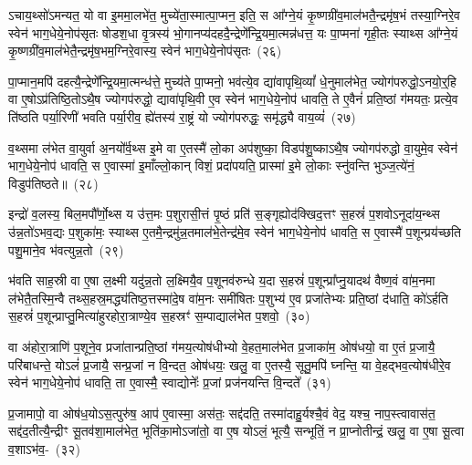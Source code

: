 ऽचाय॒थ्सो॑\-ऽमन्यत॒ यो वा इ॒ममा॒लभे॑त॒ मुच्ये॑ता॒स्मात्पा॒\-प्मन॒ इति॒ स आ᳚ग्ने॒यं कृ॒ष्णग्री॑व॒माल॑भतै॒न्द्रमृ॑ष॒भं तस्या॒ग्निरे॒व स्वेन॑ भाग॒धेये॒नोप॑सृतः षोडश॒धा वृ॒त्रस्य॑ भो॒गानप्य॑दह\-दै॒न्द्रेणे᳚न्द्रि॒य\-मा॒त्मन्न॑धत्त॒ यः पा॒प्मना॑ गृही॒तः स्याथ्स आ᳚ग्ने॒यं कृ॒ष्णग्री॑व॒माल॑भेतै॒न्द्रमृ॑ष॒भम॒ग्निरे॒वास्य॒ स्वेन॑ भाग॒धेये॒नोप॑सृतः~(२६)

पा॒प्मान॒मपि॑ दहत्यै॒न्द्रेणे᳚न्द्रि॒यमा॒त्मन्ध॑त्ते॒ मुच्य॑ते पा॒प्मनो॒ भव॑त्ये॒व द्या॑वापृथि॒व्यां᳚ धे॒नुमा\-ल॑भेत॒ ज्योग॑परुद्धो॒\-ऽनयो॒र्॒\mbox{}हि वा ए॒षो\-ऽप्र॑तिष्ठि॒तो\-ऽथै॒ष ज्योगप॑रुद्धो॒ द्यावा॑पृथि॒वी ए॒व स्वेन॑ भाग॒धेये॒नोप॑ धावति॒ ते ए॒वैनं॑ प्रति॒ष्ठां ग॑मयतः॒ प्रत्ये॒व ति॑ष्ठति पर्या॒रिणी॑ भवति पर्या॒रीव॒ ह्ये॑तस्य॑ रा॒ष्ट्रं यो ज्योग॑परुद्धः॒ समृ॑द्ध्यै वाय॒व्यं॑~(२७)

व॒थ्समा ल॑भेत वा॒युर्वा अ॒नयो᳚र्व॒थ्स इ॒मे वा ए॒तस्मै॑ लो॒का अप॑शुष्का॒ विडप॑शु॒ष्का\-ऽथै॒ष ज्योगप॑रुद्धो वा॒युमे॒व स्वेन॑ भाग॒धेये॒नोप॑ धावति॒ स ए॒वास्मा॑ इ॒माँल्लो॒कान् विशं॒ प्रदा॑पयति॒ प्रास्मा॑ इ॒मे लो॒काः स्नु॑वन्ति भुञ्ज॒त्ये॑नं॒ विडुप॑तिष्ठते॥~(२८)

{\anuvakamend[{म॒ध्यन्दि॑ने॒ कद्रुं॑ य॒मस्य॒ स्पर्ध॑मानो वैष्णावरु॒णीन्तमिन्द्रो᳚\-ऽस्य॒ स्वेन॑ भाग॒धेये॒नोप॑सृतो वाय॒व्यं॑ द्विच॑त्वारिꣳशच्च।}]}

इन्द्रो॑ व॒लस्य॒ बिल॒मपौ᳚र्णो॒थ्स य उ॑त्त॒मः प॒शुरासी॒त्तं पृ॒ष्ठं प्रति॑ स॒ङ्गृह्योद॑क्खिद॒त्तꣳ स॒हस्रं॑ प॒शवो\-ऽनूदा॑य॒न्थ्स उ॑न्न॒तो॑\-ऽभव॒द्यः प॒शुका॑मः॒ स्याथ्स ए॒तमै॒न्द्रमु॑न्न॒तमाल॑भे॒तेन्द्र॑मे॒व स्वेन॑ भाग॒धेये॒नोप॑ धावति॒ स ए॒वास्मै॑ प॒शून्प्रय॑च्छति पशु॒माने॒व भ॑वत्युन्न॒तो~(२९)

भ॑वति साह॒स्री वा ए॒षा ल॒क्ष्मी यदु॑न्न॒तो ल॒क्ष्मियै॒व प॒शूनव॑\-रुन्धे य॒दा स॒हस्रं॑ प॒शून्प्रा᳚प्नु॒यादथ॑ वैष्ण॒वं वा॑म॒नमा ल॑भेतै॒तस्मि॒न्वै तथ्स॒हस्र॒मद्ध्य॑तिष्ठ॒त्तस्मा॑दे॒ष वा॑म॒नः समी॑षितः प॒शुभ्य॑ ए॒व प्रजा॑तेभ्यः प्रति॒ष्ठां द॑धाति॒ को॑\-ऽर्\mbox{}हति स॒हस्रं॑ प॒शून्प्राप्तु॒मित्या॑हुरहोरा॒त्राण्ये॒व स॒हस्रꣳ॑ स॒म्पाद्याल॑भेत प॒शवो॒~(३०)

वा अ॑होरा॒त्राणि॑ प॒शूने॒व प्रजा॑तान्प्रति॒ष्ठां ग॑मय॒त्योष॑धीभ्यो वे॒हत॒माल॑भेत प्र॒जाका॑म॒ ओष॑धयो॒ वा ए॒तं प्र॒जायै॒ परि॑बाधन्ते॒ यो\-ऽलं॑ प्र॒जायै॒ सन्प्र॒जां न वि॒न्दत॒ ओष॑धयः॒ खलु॒ वा ए॒तस्यै॒ सूतु॒मपि॑ घ्नन्ति॒ या वे॒हद्भव॒त्योष॑धीरे॒व स्वेन॑ भाग॒धेये॒नोप॑ धावति॒ ता ए॒वास्मै॒ स्वाद्योनेः᳚ प्र॒जां प्रज॑नयन्ति वि॒न्दते᳚~(३१)

प्र॒जामापो॒ वा ओष॑ध॒यो\-ऽस॒त्पुरु॑ष॒ आप॑ ए॒वास्मा॒ अस॑तः॒ सद्द॑दति॒ तस्मा॑दाहु॒र्यश्चै॒वं वेद॒ यश्च॒ नाप॒स्त्वावास॑त॒ सद्द॑द॒तीत्यै॒न्द्रीꣳ सू॒तव॑शा॒मा\-ल॑भेत॒ भूति॑का॒मो\-ऽजा॑तो॒ वा ए॒ष यो\-ऽलं॒ भूत्यै॒ सन्भूतिं॒ न प्रा॒प्नोतीन्द्रं॒ खलु॒ वा ए॒षा सू॒त्वा व॒शा\-ऽभ॑व॒-~(३२)


